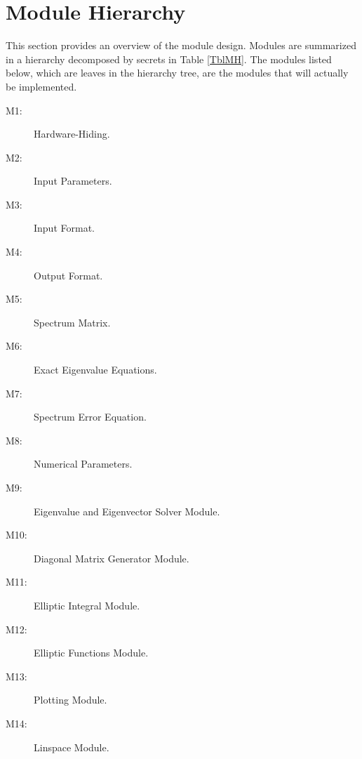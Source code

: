 \documentclass[12pt, titlepage]{article}
\begin{document}
\newpage 
\section{Module Hierarchy} \label{SecMH}

This section provides an overview of the module design. Modules are summarized
in a hierarchy decomposed by secrets in Table \ref{TblMH}. The modules listed
below, which are leaves in the hierarchy tree, are the modules that will
actually be implemented.

\begin{description}
\item[M1:] Hardware-Hiding.\\
\item[M2:] Input Parameters.\\
\item[M3:] Input Format.\\
\item[M4:] Output Format.\\
\item[M5:] Spectrum Matrix.\\
\item[M6:] Exact Eigenvalue Equations.\\ 
\item[M7:] Spectrum Error Equation.\\
\item[M8:] Numerical Parameters. \\
\item[M9:] Eigenvalue and Eigenvector Solver Module. \\
\item[M10:] Diagonal Matrix Generator Module.\\ 
\item[M11:] Elliptic Integral Module. \\
\item[M12:] Elliptic Functions Module. \\
\item[M13:] Plotting Module. \\ 
\item[M14:] Linspace Module. \\
\end{description}
\end{document}
